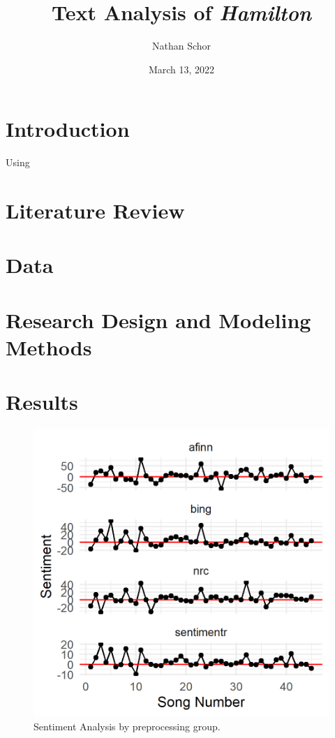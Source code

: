 \documentclass{article}
\title{Text Analysis of \emph{Hamilton}}
\author{Nathan Schor}
\date{March 13, 2022}
\begin{document}
\maketitle
\tableofcontents
\listoffigures

\section{Introduction}

Using \cite{Silge2022}




\section{Literature Review}



\section{Data}



\section{Research Design and Modeling Methods}

\section{Results}

\begin{figure}[h]
    \caption{Sentiment Analysis by preprocessing group. \label{fig:sentiment}}
    \centering
    \includegraphics[width=0.2\paperwidth]{sentiment_by_stopwords.png}
\end{figure}
\end{document}
